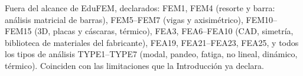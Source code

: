 \documentclass[11pt,a4paper]{article}
\begin{document}
Fuera del alcance de EduFEM, declarados: FEM1, FEM4 (resorte y barra: análisis matricial de barras), FEM5--FEM7 (vigas y axisimétrico), FEM10--FEM15 (3D, placas y cáscaras, térmico), FEA3, FEA6--FEA10 (CAD, simetría, biblioteca de materiales del fabricante), FEA19, FEA21--FEA23, FEA25, y todos los tipos de análisis TYPE1--TYPE7 (modal, pandeo, fatiga, no lineal, dinámico, térmico). Coinciden con las limitaciones que la Introducción ya declara.
\end{document}
